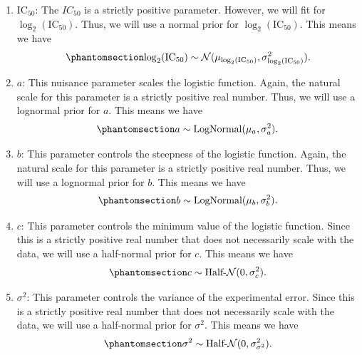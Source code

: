 \documentclass[
]{scrartcl}
\begin{document}
\begin{refsection}
\begin{enumerate}
\def\labelenumi{\arabic{enumi}.}
\item
  \(\mathrm{IC}_{50}\): The \(IC_{50}\) is a strictly positive
  parameter. However, we will fit for \(\log_2(\mathrm{IC}_{50})\).
  Thus, we will use a normal prior for \(\log_2(\mathrm{IC}_{50})\).
  This means we have
  \begin{equation}\phantomsection\label{eq-bayes-ic50-prior-ic50}{
  \log_2(\mathrm{IC}_{50}) \sim 
  \mathcal{N}(
   \mu_{\log_2(\mathrm{IC}_{50})}, \sigma_{\log_2(\mathrm{IC}_{50})}^2
  ).
  }\end{equation}
\item
  \(a\): This nuisance parameter scales the logistic function. Again,
  the natural scale for this parameter is a strictly positive real
  number. Thus, we will use a lognormal prior for \(a\). This means we
  have \begin{equation}\phantomsection\label{eq-bayes-ic50-prior-a}{
  a \sim \text{LogNormal}(\mu_a, \sigma_a^2).
  }\end{equation}
\item
  \(b\): This parameter controls the steepness of the logistic function.
  Again, the natural scale for this parameter is a strictly positive
  real number. Thus, we will use a lognormal prior for \(b\). This means
  we have \begin{equation}\phantomsection\label{eq-bayes-ic50-prior-b}{
  b \sim \text{LogNormal}(\mu_b, \sigma_b^2).
  }\end{equation}
\item
  \(c\): This parameter controls the minimum value of the logistic
  function. Since this is a strictly positive real number that does not
  necessarily scale with the data, we will use a half-normal prior for
  \(c\). This means we have
  \begin{equation}\phantomsection\label{eq-bayes-ic50-prior-c}{
  c \sim \text{Half-}\mathcal{N}(0, \sigma_c^2).
  }\end{equation}
\item
  \(\sigma^2\): This parameter controls the variance of the experimental
  error. Since this is a strictly positive real number that does not
  necessarily scale with the data, we will use a half-normal prior for
  \(\sigma^2\). This means we have
  \begin{equation}\phantomsection\label{eq-bayes-ic50-prior-sigma}{
  \sigma^2 \sim \text{Half-}\mathcal{N}(0, \sigma_{\sigma^2}^2).
  }\end{equation}
\end{enumerate}


\end{refsection}
\end{document}
